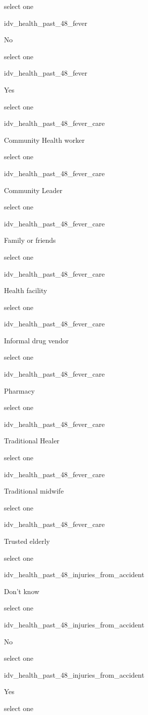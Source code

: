 \documentclass[]{article}
\begin{document}
select one

idv\_health\_past\_48\_fever

No

select one

idv\_health\_past\_48\_fever

Yes

select one

idv\_health\_past\_48\_fever\_care

Community Health worker

select one

idv\_health\_past\_48\_fever\_care

Community Leader

select one

idv\_health\_past\_48\_fever\_care

Family or friends

select one

idv\_health\_past\_48\_fever\_care

Health facility

select one

idv\_health\_past\_48\_fever\_care

Informal drug vendor

select one

idv\_health\_past\_48\_fever\_care

Pharmacy

select one

idv\_health\_past\_48\_fever\_care

Traditional Healer

select one

idv\_health\_past\_48\_fever\_care

Traditional midwife

select one

idv\_health\_past\_48\_fever\_care

Trusted elderly

select one

idv\_health\_past\_48\_injuries\_from\_accident

Don't know

select one

idv\_health\_past\_48\_injuries\_from\_accident

No

select one

idv\_health\_past\_48\_injuries\_from\_accident

Yes

select one
\end{document}
